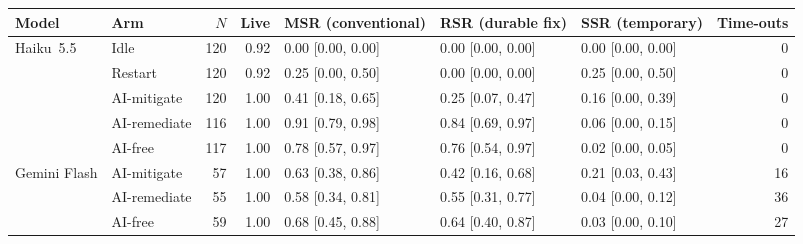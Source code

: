 \begin{tabular}{llrrlllr}
\toprule
Model & Arm & $N$ & Live & MSR (conventional) & RSR (durable fix) & SSR (temporary) & Time-outs \\
\midrule
Haiku~5.5 & Idle & 120 & 0.92 & 0.00 [0.00, 0.00] & 0.00 [0.00, 0.00] & 0.00 [0.00, 0.00] & 0 \\
 & Restart & 120 & 0.92 & 0.25 [0.00, 0.50] & 0.00 [0.00, 0.00] & 0.25 [0.00, 0.50] & 0 \\
 & AI-mitigate & 120 & 1.00 & 0.41 [0.18, 0.65] & 0.25 [0.07, 0.47] & 0.16 [0.00, 0.39] & 0 \\
 & AI-remediate & 116 & 1.00 & 0.91 [0.79, 0.98] & 0.84 [0.69, 0.97] & 0.06 [0.00, 0.15] & 0 \\
 & AI-free & 117 & 1.00 & 0.78 [0.57, 0.97] & 0.76 [0.54, 0.97] & 0.02 [0.00, 0.05] & 0 \\
\midrule
Gemini Flash & AI-mitigate & 57 & 1.00 & 0.63 [0.38, 0.86] & 0.42 [0.16, 0.68] & 0.21 [0.03, 0.43] & 16 \\
 & AI-remediate & 55 & 1.00 & 0.58 [0.34, 0.81] & 0.55 [0.31, 0.77] & 0.04 [0.00, 0.12] & 36 \\
 & AI-free & 59 & 1.00 & 0.68 [0.45, 0.88] & 0.64 [0.40, 0.87] & 0.03 [0.00, 0.10] & 27 \\
\bottomrule
\end{tabular}
